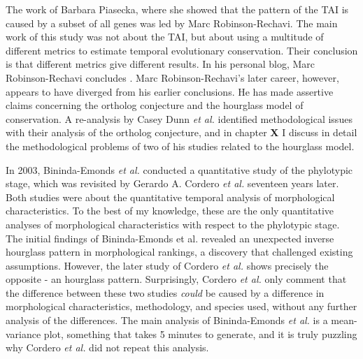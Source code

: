 The work of Barbara Piasecka, where she showed that the pattern of the TAI is caused by a subset of all genes was led by Marc Robinson-Rechavi. The main work of this study was not about the TAI, but about using a multitude of different metrics to estimate temporal evolutionary conservation. Their conclusion is that different metrics give different results. In his personal blog, Marc Robinson-Rechavi concludes \cite{robinsonrechaviblog}. Marc Robinson-Rechavi's later career, however, appears to have diverged from his earlier conclusions. He has made assertive claims concerning the ortholog conjecture\cite{KryuchkovaMostacci2016} and the hourglass model of conservation\cite{Liu2020,Liu2021,marletaz2018}. A re-analysis by Casey Dunn \textit{et al.} identified methodological issues with their analysis of the ortholog conjecture\cite{Dunn2018}, and in chapter \textbf{X} I discuss in detail the methodological problems of two of his studies related to the hourglass model.

In 2003, Bininda-Emonds \textit{et al.} conducted a quantitative study of the phylotypic stage, which was revisited by Gerardo A. Cordero \textit{et al.} seventeen years later\cite{OlafRP2003, Cordero2020}. Both studies were about the quantitative temporal analysis of morphological characteristics. To the best of my knowledge, these are the only quantitative analyses of morphological characteristics with respect to the phylotypic stage. The initial findings of Bininda-Emonds et al. revealed an unexpected inverse hourglass pattern in morphological rankings, a discovery that challenged existing assumptions. However, the later study of Cordero \textit{et al.} shows precisely the opposite - an hourglass pattern. Surprisingly, Cordero \textit{et al.} only comment that the difference between these two studies \textit{could} be caused by a difference in morphological characteristics, methodology, and species used, without any further analysis of the differences. The main analysis of Bininda-Emonds \textit{et al.} is a mean-variance plot, something that takes 5 minutes to generate, and it is truly puzzling why Cordero \textit{et al.} did not repeat this analysis.

